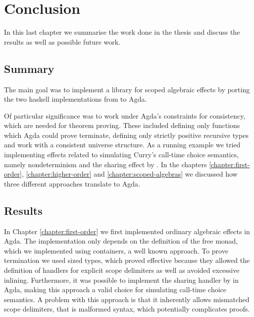 \documentclass[10pt,a4paper,twoside,notitlepage]{report}
\begin{document}
\chapter{Conclusion}
\label{chapter:conclusion}

In this last chapter we summarise the work done in the thesis and discuss the
results as well as possible future work.

\section{Summary}

The main goal was to implement a library for scoped algebraic effects by
porting the two haskell implementations from
 to Agda.

Of particular significance was to work under Agda's constraints for consistency,
which are needed for theorem proving.
These included defining only functions which Agda could prove terminate, defining
only strictly positive recursive types and work with a consistent universe
structure.
As a running example we tried implementing effects related to simulating Curry's
call-time choice semantics, namely nondeterminism and the sharing effect by
\textcite{bunkenburg2019modeling}.
In the chapters \ref{chapter:first-order}, \ref{chapter:higher-order} and
\ref{chapter:scoped-algebras} we discussed how three different approaches
translate to Agda.


\section{Results}

In Chapter \ref{chapter:first-order} we first implemented ordinary algebraic
effects in Agda.
The implementation only depends on the definition of the free monad, which
we implemented using containers, a well known approach.
To prove termination we used sized types, which proved effective because they
allowed the definition of \textcite{DBLP:conf/haskell/WuSH14} handlers for
explicit scope delimiters as well as avoided excessive inlining.
Furthermore, it was possible to implement the sharing handler by
\textcite{bunkenburg2019modeling} in Agda, making this approach a valid choice
for simulating call-time choice semantics.
A problem with this approach is that it inherently allows mismatched scope
delimiters, that is malformed syntax, which potentially complicates proofs.
\end{document}
